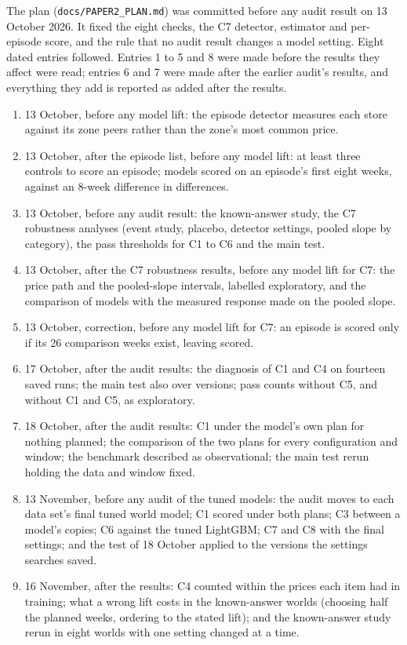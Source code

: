 The plan (\texttt{docs/PAPER2\_PLAN.md}) was committed before any audit result
on 13 October 2026. It fixed the eight checks, the C7 detector, estimator and
per-episode score, and the rule that no audit result changes a model setting.
Eight dated entries followed. Entries 1 to 5 and 8 were made before the results
they affect were read; entries 6 and 7 were made after the earlier audit's
results, and everything they add is reported as added after the results.
\begin{enumerate}\setlength{\itemsep}{1pt}
\item 13 October, before any model lift: the episode detector measures each
store against its zone peers rather than the zone's most common price.
\item 13 October, after the episode list, before any model lift: at least three
controls to score an episode; models scored on an episode's first eight weeks,
against an 8-week difference in differences.
\item 13 October, before any audit result: the known-answer study, the C7
robustness analyses (event study, placebo, detector settings, pooled slope by
category), the pass thresholds for C1 to C6 and the main test.
\item 13 October, after the C7 robustness results, before any model lift for
C7: the price path and the pooled-slope intervals, labelled exploratory, and
the comparison of models with the measured response made on the pooled slope.
\item 13 October, correction, before any model lift for C7: an episode is
scored only if its 26 comparison weeks exist, leaving \zScored{} scored.
\item 17 October, after the audit results: the diagnosis of C1 and C4 on
fourteen saved runs; the main test also over versions; pass counts without C5,
and without C1 and C5, as exploratory.
\item 18 October, after the audit results: C1 under the model's own plan for
nothing planned; the comparison of the two plans for every configuration and
window; the benchmark described as observational; the main test rerun holding
the data and window fixed.
\item 13 November, before any audit of the tuned models: the audit moves to
each data set's final tuned world model; C1 scored under both plans; C3
between a model's copies; C6 against the tuned LightGBM; C7 and C8 with the
final settings; and the test of 18 October applied to the versions the
settings searches saved.
\item 16 November, after the results: C4 counted within the prices each item had in training; what a
wrong lift costs in the known-answer worlds (choosing half the planned weeks, ordering to the stated
lift); and the known-answer study rerun in eight worlds with one setting changed at a time.
\end{enumerate}

